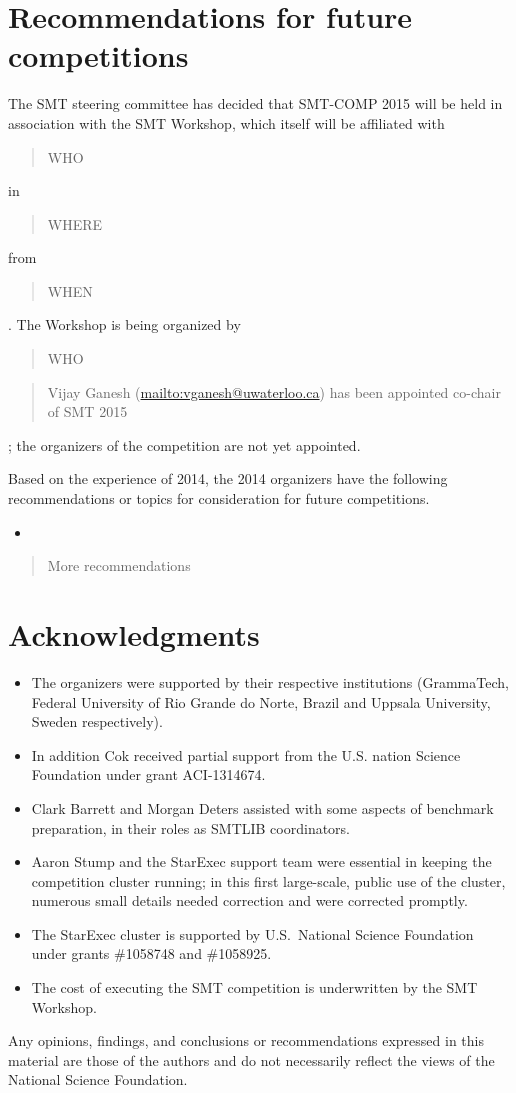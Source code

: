 \documentclass[twosize,11pt]{article}
\newcommand{\comment}[2]{\begin{quote}\sc #1\marginpar{\textcolor{red}{$\ast^{\mbox{#2}}$}}\end{quote}}
\newcommand{\davidd}[1]{\comment{#1}{DD}}
\newcommand{\davidc}[1]{\comment{#1}{DC}}
\begin{document}
\section{Recommendations for future competitions}

The SMT steering committee has decided that SMT-COMP 2015 will be held in association with the SMT Workshop, which itself will be affiliated with \davidc{WHO} in \davidc{WHERE} from \davidc{WHEN}.
The Workshop is being organized by \davidc{WHO}
\davidd{Vijay Ganesh (\url{mailto:vganesh@uwaterloo.ca}) has been appointed co-chair of SMT 2015}; the organizers of the competition are not yet appointed.

Based on the experience of 2014, the 2014 organizers have the following recommendations or topics for consideration for future competitions.
\begin{itemize}
\item
\end{itemize}
\davidc{More recommendations}
\section*{Acknowledgments} 
\begin{itemize}
\item The organizers were supported by their respective institutions (GrammaTech, Federal University of Rio Grande do Norte, Brazil and Uppsala University, Sweden respectively). 

\item In addition Cok received partial support from the U.S. nation Science Foundation
under grant ACI-1314674.

\item Clark Barrett and Morgan Deters assisted with some aspects of benchmark preparation,
in their roles as SMTLIB coordinators.

\item Aaron Stump and the StarExec support team were essential in keeping the competition cluster running;
in this first large-scale, public use of the cluster, numerous small details needed correction and were corrected promptly.

\item The StarExec cluster is supported by 
U.S.\ National Science Foundation under grants \#1058748 and \#1058925.


\item The cost of executing the SMT competition is underwritten by the SMT Workshop. 
\end{itemize}

Any opinions,
findings, and conclusions or recommendations expressed in this
material are those of the authors and do not necessarily reflect the
views of the National Science Foundation.



\end{document}
